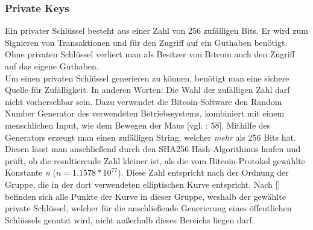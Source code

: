 \subsubsection{Private Keys}
Ein privater Schlüssel besteht aus einer Zahl von 256 zufälligen Bits. Er wird zum Signieren von Transaktionen und für den Zugriff auf ein Guthaben benötigt. Ohne privaten Schlüssel verliert man als Besitzer von Bitcoin auch den Zugriff auf das eigene Guthaben.\\
Um einen privaten Schlüssel generieren zu können, benötigt man eine sichere Quelle für Zufälligkeit. In anderen Worten: Die Wahl der zufälligen Zahl darf nicht vorhersehbar sein. Dazu verwendet die Bitcoin-Software den Random Number Generator des verwendeten Betriebssystems, kombiniert mit einem menschlichen Input, wie dem Bewegen der Maus [vgl. \cite{antanopoulos_2014}: 58]. Mithilfe des Generators erzeugt man einen zufälligen String, welcher \emph{mehr} als 256 Bits hat. Diesen lässt man anschließend durch den SHA256 Hash-Algorithmus laufen und prüft, ob die resultierende Zahl kleiner ist, als die vom Bitcoin-Protokol gewählte Konstante \emph{n} ($n = 1.1578 * 10^{77}$). Diese Zahl entspricht nach der Ordnung der Gruppe, die in der dort verwendeten elliptischen Kurve entspricht. Nach [\cite{corbellini_2015}] befinden sich alle Punkte der Kurve in dieser Gruppe, weshalb der gewählte private Schlüssel, welcher für die anschließende Generierung eines öffentlichen Schlüssels genutzt wird, nicht außerhalb dieses Bereichs liegen darf.

